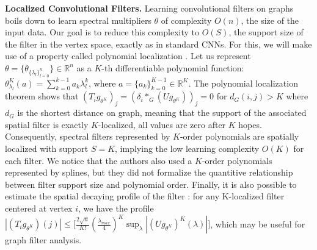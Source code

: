 \documentclass{article}
\begin{document}
{\bf Localized Convolutional Filters.} Learning convolutional filters on graphs boils down to learn spectral multipliers $\theta$ of complexity $O(n)$, the size of the input data. Our goal is to reduce this complexity to $O(S)$, the support size of the filter in the vertex space, exactly as in standard CNNs. For this, we will make use of a property called polynomial localization \cite{art:ShumanRicaudVandergheynst16Local}. Let us represent $\theta=\{\theta_{\{{\lambda_l}\}_{l=0}^n}\}\in\mathbb{R}^n$ as a $K$-th differentiable polynomial function: $\theta_{\lambda_l}^K(a)=\sum_{k=0}^{k-1}a_k \lambda_l^k$, where $a=\{a_k\}_{k=0}^{K-1}\in\mathbb{R}^K$. The polynomial localization theorem \cite{art:ShumanRicaudVandergheynst16Local} shows that $(T_ig_{\theta^K})_j=(\delta_i \ast_G (Ug_{\theta^K}))_j=0$ for $d_G(i,j)>K$ where $d_G$ is the shortest distance on graph, meaning that the support of the associated spatial filter is exactly $K$-localized, all values are zero after $K$ hopes. Consequently, spectral filters represented by $K$-order polynomials are spatially localized with support $S=K$, implying the low learning complexity $O(K)$ for each filter. We notice that the authors \cite{art:HenaffBrunaLeCun15DLgraphs} also used a $K$-order polynomials represented by splines, but they did not formalize the quantitive relationship between filter support size and polynomial order. Finally, it is also possible to estimate the spatial decaying profile of the filter \cite{art:ShumanRicaudVandergheynst16Local}: for any K-localized filter centered at vertex $i$, we have the profile $|(T_ig_{\theta^K})(j)|\leq\big[\frac{2\sqrt{n}}{K!}(\frac{\lambda_{max}}{4})^K \sup_{\lambda}|(Ug_{\theta^K})^K(\lambda)|\big]$, which may be useful for graph filter analysis. 
\end{document}
